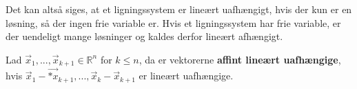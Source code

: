Det kan altså siges, at et ligningssystem er lineært uafhængigt, hvis der kun er en løsning, så der ingen frie variable er. Hvis et ligningssystem har frie variable, er der uendeligt mange løsninger og kaldes derfor lineært afhængigt. 

\begin{defn}
Lad $\vec{x}_1,..., \vec{x}_{k+1} \in \mathds{R}^n$ for $k \leq n$, da er vektorerne \textbf{affint lineært uafhængige}, hvis 
$\vec{x}_1- \vec{
*x}_{k+1},...,\vec{x}_k- \vec{x}_{k+1}$ er lineært uafhængige.
\end{defn}



